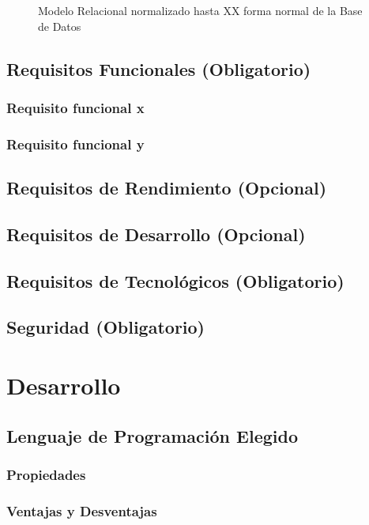 \documentclass[letter,12pt]{report}
\newcommand\rojo[1]{\textcolor[rgb]{1,0,0}{#1}}
\begin{document}
\begin{landscape}
\begin{figure}[hbt]
  \centering
  \caption{Modelo Relacional normalizado hasta XX forma normal de la Base de Datos}
  \label{MRnormalizado}
\end{figure}
\end{landscape}

\section{Requisitos Funcionales (\rojo{Obligatorio})}
\subsection{Requisito funcional x}
\subsection{Requisito funcional y}
\section{Requisitos de Rendimiento (\rojo{Opcional})}
\section{Requisitos de Desarrollo (\rojo{Opcional})}
\section{Requisitos de Tecnológicos (\rojo{Obligatorio})}
\section{Seguridad (\rojo{Obligatorio})}

\chapter{Desarrollo}
\section{Lenguaje de Programación Elegido}
\subsection{Propiedades}
\subsection{Ventajas y Desventajas}
\end{document}
